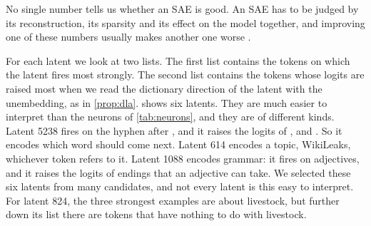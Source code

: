 No single number tells us whether an SAE is good. An SAE has to be judged by its reconstruction, its sparsity
and its effect on the model together, and improving one of these numbers usually makes another one worse \citep{karvonen2025saebench}.

\begin{experiment}\label{exp:latents} 
For each latent we look at two lists. The first list contains the tokens on which the latent fires most
strongly. The second list contains the tokens whose logits are raised most when we read the dictionary direction of
the latent with the unembedding, as in \cref{prop:dla}.  shows six latents. They are much easier
to interpret than the neurons of \cref{tab:neurons}, and they are of different kinds. Latent 5238 fires on the
hyphen after , and it raises the logits of ,  and . So it
encodes which word should come next. Latent 614 encodes a topic, WikiLeaks, whichever token refers to it. Latent
1088 encodes grammar: it fires on adjectives, and it raises the logits of endings that an adjective can take. We
selected these six latents from many candidates, and not every latent is this easy to interpret. For latent 824,
the three strongest examples are about livestock, but further down its list there are tokens that have nothing to
do with livestock.
\end{experiment}

